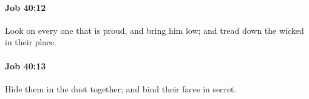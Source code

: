 		\paragraph{Job 40:12} %
			\label{JOB-40-12}

			Look on every one that is proud, and bring him low; and tread down the wicked in their place.


		\paragraph{Job 40:13} %
			\label{JOB-40-13}

			Hide them in the dust together; and bind their faces in secret.


